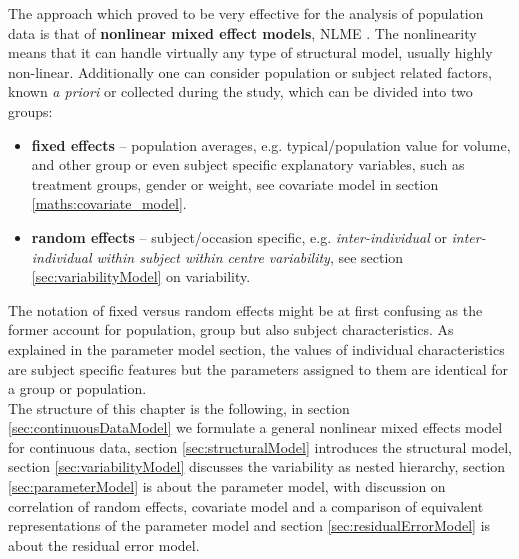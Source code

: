 The approach which proved to be very effective for the analysis of population 
data is that of \textbf{nonlinear mixed effect models}, NLME 
\cite{Bonate:2011fk,LavielleBook:2014}. 
The nonlinearity means that it can handle virtually any type of structural 
model, usually highly non-linear. Additionally one can consider population 
or subject related factors, known \emph{a priori} or collected during the 
study, which can be divided into two groups:
\begin{itemize}
\item
\textbf{fixed effects} -- population averages, e.g. typical/population value 
for volume, and other group or even subject specific explanatory variables, 
such as treatment groups, gender or weight, see covariate model in 
section \ref{maths:covariate_model}.
\item
\textbf{random effects} -- subject/occasion specific, e.g. \textit{inter-individual} 
or \textit{inter-individual within subject within centre variability}, see section 
\ref{sec:variabilityModel} on variability.
\end{itemize}
The notation of fixed versus random effects might be at first confusing as the 
former account for population, group but also subject characteristics. As 
explained in the parameter model section, the values of individual characteristics 
are subject specific features but the parameters assigned to them are identical 
for a group or population. \\
The structure of this chapter is the following, in section \ref{sec:continuousDataModel} 
we formulate a general nonlinear mixed effects model for continuous data, 
section \ref{sec:structuralModel} introduces the structural model, section 
\ref{sec:variabilityModel} discusses the variability as nested hierarchy, section 
\ref{sec:parameterModel} is about the parameter model, with discussion on 
correlation of random effects, covariate model and a comparison of equivalent 
representations of the parameter model and section \ref{sec:residualErrorModel} 
is about the residual error model. 










